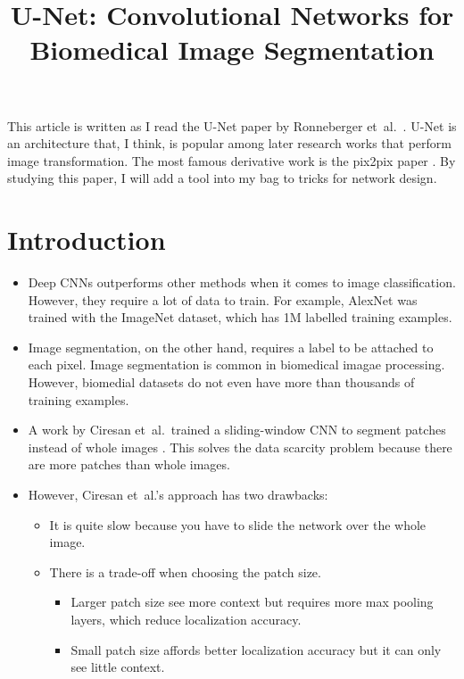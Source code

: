 \documentclass[10pt]{article}
\title{U-Net: Convolutional Networks for Biomedical Image Segmentation}
\author{}
\newcommand{\etal}{{et~al.}}
\begin{document}
  \maketitle

  This article is written as I read the U-Net paper by Ronneberger \etal\ \cite{Ronneberger:2015}. U-Net is an architecture that, I think, is popular among later research works that perform image transformation. The most famous derivative work is the pix2pix paper \cite{Isola:2016}. By studying this paper, I will add a tool into my bag to tricks for network design.

  \section{Introduction}

  \begin{itemize}
  	\item Deep CNNs outperforms other methods when it comes to image classification. However, they require a lot of data to train. For example, AlexNet \cite{Krizhevsky:2012} was trained with the ImageNet dataset, which has 1M labelled training examples.

  	\item Image segmentation, on the other hand, requires a label to be attached to each pixel. Image segmentation is common in biomedical imagae processing. However, biomedial datasets do not even have more than thousands of training examples.

  	\item A work by Ciresan \etal\ trained a sliding-window CNN to segment patches instead of whole images \cite{Ciresan:2012}. This solves the data scarcity problem because there are more patches than whole images.

  	\item However, Ciresan \etal's approach has two drawbacks:
  	\begin{itemize}
  		\item It is quite slow because you have to slide the network over the whole image.

  		\item There is a trade-off when choosing the patch size.
  		\begin{itemize}
  			\item Larger patch size see more context but requires more max pooling layers, which reduce localization accuracy.

  			\item Small patch size affords better localization accuracy but it can only see little context.
  		\end{itemize}
  	\end{itemize}


\end{itemize}
\end{document}
